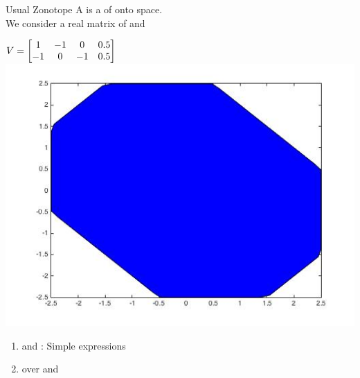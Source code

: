 
\begin{frame}{Usual Zonotope}
A  is a  of 
onto  space.\\[0.5em]
%
We consider a real matrix of  and 
\begin{block}{}
%
\end{block}
%
\vspace{0.5em}
%
\begin{minipage}{0.43\textwidth}
{\scriptsize $V=\left[\begin{matrix}1 &   -1 &          0 &    0.5 \\
   -1 &         0 &   -1 &    0.5\end{matrix}\right]$}
\includegraphics[scale=0.25]{figures/CZtopes/RealZonotope.jpg}
\end{minipage}
%
\vline
%
\begin{minipage}{0.55\textwidth}
\begin{enumerate}
\item {} and : Simple  expressions
\item {} over  and 
%
%
%
\end{enumerate}
%
\end{minipage}
%
\end{frame}

